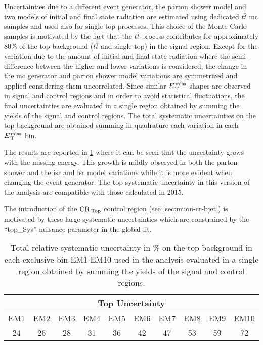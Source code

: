 Uncertainties due to a different event generator, the parton shower model and
two models of initial and final state radiation are estimated using dedicated
$t \bar{t}$ \gls{mc} samples and used also for single top processes. This choice
of the Monte Carlo samples is motivated by the fact that the $t \bar{t}$ process
contributes for approximately 80\% of the top background ($t \bar{t}$ and single
top) in the signal region.
Except for the variation due to the amount of initial and final state radiation
where the semi-difference between the higher and lower variations is considered,
the change in the \gls{mc} generator and parton shower model variations are
symmetrized and applied considering them uncorrelated. Since similar $E_\mathrm{\, T}^\mathrm{\, miss}$
shapes are observed in signal and control regions and in order to avoid
statistical fluctuations, the final uncertainties are evaluated in a single
region obtained by summing the yields of the signal and control regions.
The total systematic uncertainties on the top background are obtained summing in
quadrature each variation in each $E_\mathrm{\, T}^\mathrm{\, miss}$ bin.

The results are reported in \cref{tab:top_syst_2016} where it can be seen that
the uncertainty grows with the missing energy. This growth is mildly observed in
both the parton shower and the \gls{isr} and \gls{fsr} model variations while it
is more evident when changing the event generator. The top systematic
uncertainty in this version of the analysis are compatible with those calculated
in 2015.

The introduction of the $\mathrm{CR}_\mathrm{\, Top}$ control region (see \cref{sec:muon-cr-bjet}) is
motivated by these large systematic uncertainties which are constrained by the
``top\_Sys'' nuisance parameter in the global fit.
\begin{table}[!htb]
  \centering
  \begin{tabular}{cccccccccc}
    \toprule
    \multicolumn{10}{c}{Top Uncertainty} \\
    \midrule \midrule
    EM1 & EM2 & EM3 & EM4 & EM5 & EM6 & EM7 & EM8 & EM9 & EM10 \\
    \midrule
    24 & 26 & 28 & 31 & 36 & 42 & 47 & 53 & 59 & 72 \\
    \bottomrule
  \end{tabular}
  \caption{Total relative systematic uncertainty in \% on the top background in
    each exclusive bin EM1-EM10 used in the analysis evaluated in a single
    region obtained by summing the yields of the signal and control regions.}
  \label{tab:top_syst_2016}
\end{table}
